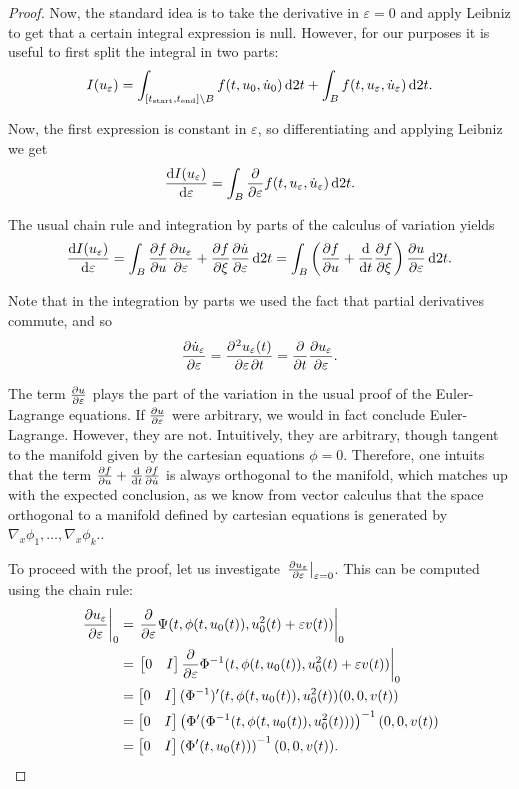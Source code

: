 \documentclass{article}
\theoremstyle{plain}
\theoremstyle{plain}
\theoremstyle{nonumberplain}
\newtheorem{proof}{Proof}
\theoremstyle{empty}
\newcommand{\tstart}{\mathrm{start}}
\newcommand{\tend}{\mathrm{end}}
\DeclarePairedDelimiter\eval{.}{\rvert}
\begin{document}
\begin{proof}
Now, the standard idea is to take the derivative in $\varepsilon = 0$ and apply Leibniz to get that a certain integral expression is null. However, for our purposes it is useful to first split the integral in two parts:
\[I(u_\varepsilon) = \int_{[t_\tstart,t_\tend] \setminus B} f(t,u_0,\dot u_0) \dl2 t + \int_B f(t,u_\varepsilon, \dot u_\varepsilon) \dl2 t.\]

Now, the first expression is constant in $\varepsilon$, so differentiating and applying Leibniz we get
\[\diff{I(u_\varepsilon)}\varepsilon = \int_B \diffp*{f(t,u_\varepsilon, \dot u_\varepsilon)}\varepsilon \dl2 t.\]

The usual chain rule and integration by parts of the calculus of variation yields
\[
\diff{I(u_\varepsilon)}\varepsilon = \int_B \diffp f u \diffp{u_\varepsilon}\varepsilon + \diffp f {\xi} \diffp{\dot u}\varepsilon \dl2 t = \int_B \left( \diffp f u + \diff*{\diffp f {\xi}}t \right) \diffp{u}\varepsilon \dl2 t.
\]

Note that in the integration by parts we used the fact that partial derivatives commute, and so
\[\diffp{\dot u_\varepsilon}\varepsilon = \diffp{u_\varepsilon(t)}{\varepsilon,t} = \diffp*{\diffp {u_\varepsilon} \varepsilon}t.\]

The term $\diffp u \varepsilon$ plays the part of the variation in the usual proof of the Euler-Lagrange equations. If $\diffp u \varepsilon$ were arbitrary, we would in fact conclude Euler-Lagrange. However, they are not. Intuitively, they are arbitrary, though tangent to the manifold given by the cartesian equations $\phi = 0$. Therefore, one intuits that the term $\diffp f u + \diff*{\diffp f {\dot u}}t$ is always orthogonal to the manifold, which matches up with the expected conclusion, as we know from vector calculus that the space orthogonal to a manifold defined by cartesian equations is generated by $\nabla_x \phi_1, \dots, \nabla_x \phi_k$..

To proceed with the proof, let us investigate $\eval*{\diffp {u_\varepsilon} \varepsilon}_{\varepsilon = 0}$. This can be computed using the chain rule:
\begin{align*}
\eval*{\diffp {u_\varepsilon} \varepsilon}_0 &= \eval*{\diffp*{\Psi(t, \phi(t,u_0(t)), u_0^2(t) + \varepsilon v(t))} \varepsilon}_0\\
&= \eval*{\begin{bmatrix} 0 & I \end{bmatrix} \diffp*{\Phi^{-1}(t, \phi(t,u_0(t)), u_0^2(t) + \varepsilon v(t))} \varepsilon}_0\\
&= \begin{bmatrix} 0 & I \end{bmatrix} (\Phi^{-1})'(t, \phi(t,u_0(t)), u_0^2(t)) (0, 0, v(t))\\
&= \begin{bmatrix} 0 & I \end{bmatrix} \left(\Phi'(\Phi^{-1}(t, \phi(t,u_0(t)), u_0^2(t)))\right)^{-1} (0,0,v(t))\\
&= \begin{bmatrix} 0 & I \end{bmatrix} \left( \Phi'(t, u_0(t)) \right)^{-1} (0,0,v(t)).
\end{align*}


\end{proof}
\end{document}
